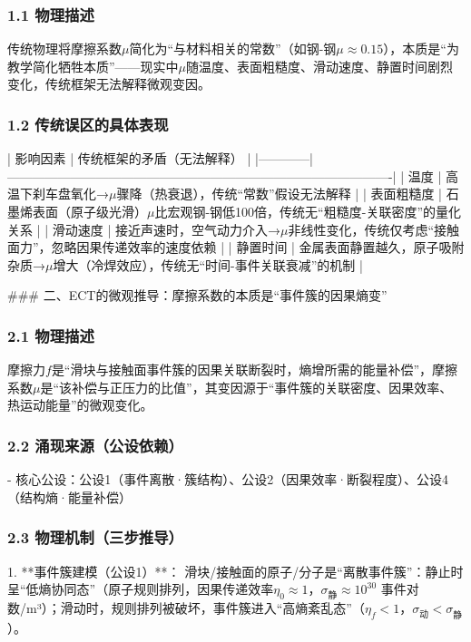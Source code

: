 \documentclass{article}
\begin{document}
\subsubsection{1.1 物理描述}
传统物理将摩擦系数$\mu$简化为“与材料相关的常数”（如钢-钢$\mu≈0.15$），本质是“为教学简化牺牲本质”——现实中$\mu$随温度、表面粗糙度、滑动速度、静置时间剧烈变化，传统框架无法解释微观变因。

\subsubsection{1.2 传统误区的具体表现}
| 影响因素   | 传统框架的矛盾（无法解释）                                                                 |
|------------|-------------------------------------------------------------------------------------------|
| 温度       | 高温下刹车盘氧化→$\mu$骤降（热衰退），传统“常数”假设无法解释                                 |
| 表面粗糙度 | 石墨烯表面（原子级光滑）$\mu$比宏观钢-钢低100倍，传统无“粗糙度-关联密度”的量化关系           |
| 滑动速度   | 接近声速时，空气动力介入→$\mu$非线性变化，传统仅考虑“接触面力”，忽略因果传递效率的速度依赖   |
| 静置时间   | 金属表面静置越久，原子吸附杂质→$\mu$增大（冷焊效应），传统无“时间-事件关联衰减”的机制       |


### 二、ECT的微观推导：摩擦系数的本质是“事件簇的因果熵变”
\subsubsection{2.1 物理描述}
摩擦力$f$是“滑块与接触面事件簇的因果关联断裂时，熵增所需的能量补偿”，摩擦系数$\mu$是“该补偿与正压力的比值”，其变因源于“事件簇的关联密度、因果效率、热运动能量”的微观变化。

\subsubsection{2.2 涌现来源（公设依赖）}
- 核心公设：公设1（事件离散·簇结构）、公设2（因果效率·断裂程度）、公设4（结构熵·能量补偿）

\subsubsection{2.3 物理机制（三步推导）}
1. **事件簇建模（公设1）**：  
   滑块/接触面的原子/分子是“离散事件簇”：静止时呈“低熵协同态”（原子规则排列，因果传递效率$\eta_0 \approx 1$，$\sigma_{\text{静}} \approx 10^{30}$ 事件对数/m³）；滑动时，规则排列被破坏，事件簇进入“高熵紊乱态”（$\eta_f < 1$，$\sigma_{\text{动}} < \sigma_{\text{静}}$）。
\end{document}
